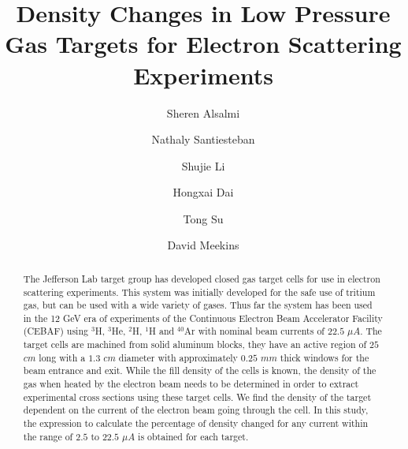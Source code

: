 \documentclass[final,5p,times,twocolumn,balance]{elsarticle}
\begin{document}
\begin{frontmatter}



\title{Density Changes in Low Pressure Gas Targets for Electron Scattering Experiments}

\author[Kent]{Sheren Alsalmi}
\author[UNH]{Nathaly Santiesteban}
\author[UNH]{Shujie Li}
\author[VT]{Hongxai Dai}
\author[Kent]{Tong Su}
\author[JLab]{David Meekins}

\address[Kent]{Kent State University, Kent, OH 44240}
\address[UNH]{University of New Hampshire, Durham, NH 03824}
\address[JLab]{Jefferson Lab, Newport News, VA 23601}
\address[VT]{Virginia Tech, Blacksburg, Virginia 24061}

\begin{abstract}
The Jefferson Lab target group has developed closed gas target cells for use in electron scattering experiments. This system was initially developed for the safe use of tritium gas, but can be used with a wide variety of gases.  Thus far the system has been used in the 12 GeV 
era of experiments of the Continuous Electron Beam Accelerator Facility (CEBAF) using $^{3}$H, $^{3}$He, $^{2}$H, $^{1}$H and $^{40}$Ar with nominal beam currents of  $22.5$ $\mu A$.  The target cells are machined from solid  aluminum blocks, they have an active region of $25$ $cm$ long with a $1.3$ $cm$ diameter with approximately $0.25$ $mm$ thick windows for the beam entrance and exit.   While the fill density of the cells is known, the density of the gas when heated by the electron beam needs to be determined in order to extract experimental cross sections using these target cells. We find the density of the target dependent on the current of the electron beam going through the cell. In this study, the expression to calculate the percentage of density changed for any current within the range of $2.5$ to $22.5$ $\mu A$ is obtained for each target.
 



\end{abstract}
\end{frontmatter}
\end{document}
